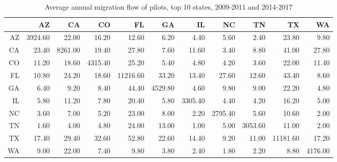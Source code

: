 \begin{table}[ht]
\centering
\begin{tabular}{rrrrrrrrrrr}
  \hline
 & AZ & CA & CO & FL & GA & IL & NC & TN & TX & WA \\ 
  \hline
AZ & 3924.60 & 22.00 & 16.20 & 12.60 & 6.20 & 4.40 & 5.60 & 2.40 & 23.80 & 9.80 \\ 
  CA & 23.40 & 8261.00 & 19.40 & 27.80 & 7.60 & 11.60 & 3.40 & 8.80 & 41.00 & 27.80 \\ 
  CO & 11.20 & 18.60 & 4315.40 & 25.20 & 5.40 & 4.80 & 4.20 & 3.60 & 22.00 & 11.40 \\ 
  FL & 10.80 & 24.20 & 18.60 & 11216.60 & 33.20 & 13.40 & 27.60 & 12.60 & 43.40 & 8.60 \\ 
  GA & 6.40 & 9.20 & 8.40 & 44.40 & 4529.80 & 4.60 & 9.80 & 9.00 & 22.20 & 4.80 \\ 
  IL & 5.80 & 11.20 & 7.80 & 20.40 & 5.80 & 3305.40 & 4.40 & 4.20 & 16.20 & 5.00 \\ 
  NC & 3.60 & 7.00 & 5.20 & 23.00 & 8.00 & 2.20 & 2795.40 & 5.60 & 10.60 & 2.00 \\ 
  TN & 1.60 & 4.00 & 4.80 & 24.00 & 13.00 & 1.00 & 5.00 & 3053.60 & 11.00 & 2.00 \\ 
  TX & 17.40 & 29.40 & 32.60 & 52.80 & 22.60 & 14.40 & 9.20 & 11.00 & 11181.60 & 17.20 \\ 
  WA & 9.00 & 22.00 & 7.40 & 9.80 & 3.80 & 2.40 & 1.80 & 2.20 & 8.80 & 4176.00 \\ 
   \hline
\end{tabular}
\caption{Average annual migration flow of pilots, top 10 states, 2009-2011 and 2014-2017} 
\end{table}
